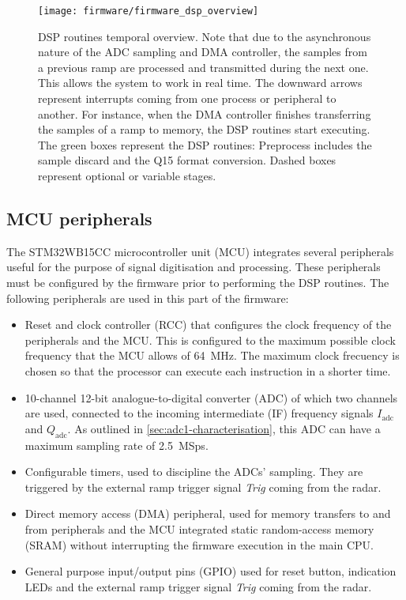 \begin{figure}[ht]
	\centering
	\texttt{[image: firmware/firmware\_dsp\_overview]}
	\caption{DSP routines temporal overview. Note that due to the asynchronous nature of the ADC sampling and DMA controller, the samples from a previous ramp are processed and transmitted during the next one. This allows the system to work in real time. The downward arrows represent interrupts coming from one process or peripheral to another. For instance, when the DMA controller finishes transferring the samples of a ramp to memory, the DSP routines start executing. The green boxes represent the DSP routines: Preprocess includes the sample discard and the Q15 format conversion. Dashed boxes represent optional or variable stages.}
	\label{fig:firmware_dsp_overview}
\end{figure}

\subsection{MCU peripherals}

The STM32WB15CC microcontroller unit (MCU) integrates several peripherals useful for the purpose of signal digitisation and processing. These peripherals must be configured by the firmware prior to performing the DSP routines. The following peripherals are used in this part of the firmware:
\begin{itemize}
	\item Reset and clock controller (RCC) that configures the clock frequency of the peripherals and the MCU. This is configured to the maximum possible clock frequency that the MCU allows of \SI{64}{\mega\hertz}. The maximum clock frecuency is chosen so that the processor can execute each instruction in a shorter time.
	\item 10-channel 12-bit analogue-to-digital converter (ADC) of which two channels are used, connected to the incoming intermediate (IF) frequency signals $I_{\mathrm{adc}}$ and $Q_{\mathrm{adc}}$. As outlined in \cref{sec:adc1-characterisation}, this ADC can have a maximum sampling rate of \SI{2.5}{MSps}.
	\item Configurable timers, used to discipline the ADCs' sampling. They are trig\-gered by the external ramp trigger signal \textit{Trig} coming from the radar.
	\item Direct memory access (DMA) peripheral, used for memory transfers to and from peripherals and the MCU integrated static random-access memory (SRAM) without interrupting the firmware execution in the main CPU.
	\item General purpose input/output pins (GPIO) used for reset button, indication LEDs and the external ramp trigger signal \textit{Trig} coming from the radar.
\end{itemize}

